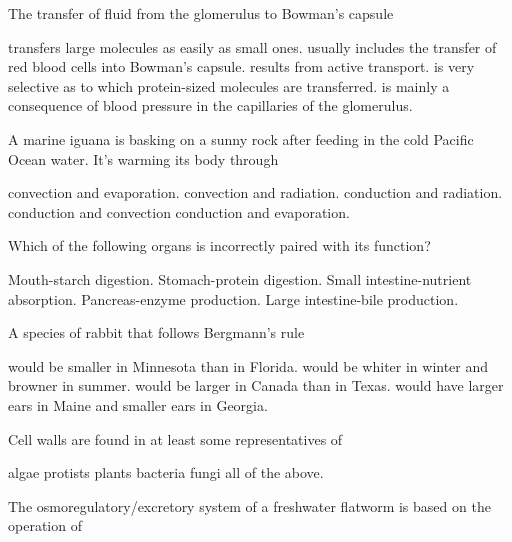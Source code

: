
\question
The transfer of fluid from the glomerulus to Bowman's capsule

\begin{choices}
\choice transfers large molecules  as easily as small ones. 
\choice usually includes the transfer of red blood cells into Bowman's capsule. 
\choice results from active transport. 
\choice is very selective as to which protein-sized molecules are transferred. 
\correctchoice  is mainly a consequence of blood pressure in the capillaries of the glomerulus. 
\end{choices}

\question
A marine iguana is basking on a sunny rock after feeding in the cold Pacific Ocean water. It's warming its body through 

\begin{choices}
\choice convection and evaporation. 
\choice convection and radiation.  
\correctchoice conduction and radiation. 
\choice conduction and convection 
\choice conduction and evaporation. 
\end{choices}

\question
Which of the following organs is incorrectly paired with its function?

\begin{choices}
\choice Mouth-starch digestion. 
\choice Stomach-protein digestion. 
\choice Small intestine-nutrient absorption. 
\choice Pancreas-enzyme production. 
\correctchoice Large intestine-bile production. 
\end{choices}

\question
A species of rabbit that follows Bergmann's rule 

\begin{choices}
\choice would be smaller in Minnesota than in Florida. 
\choice would be whiter in winter and browner in summer. 
\correctchoice  would be larger in Canada than in Texas. 
\choice would have larger ears in Maine and smaller ears in Georgia. 
\end{choices}

\question
Cell walls are found in at least some representatives of  
\begin{choices}
\choice algae 
\choice protists 
\choice plants 
\choice bacteria 
\choice fungi 
\correctchoice all of the above.  
\end{choices}

\newpage

\question
The osmoregulatory/excretory system of a freshwater flatworm is based on the operation of

